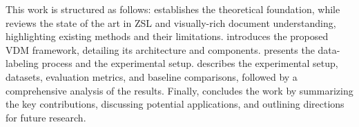 This work is structured as follows:  establishes the theoretical foundation, while  reviews the state of the art in \gls{ZSL} and visually-rich document understanding, highlighting existing methods and their limitations.  introduces the proposed \gls{VDM} framework, detailing its architecture and components.  presents the data-labeling process and the experimental setup.  describes the experimental setup, datasets, evaluation metrics, and baseline comparisons, followed by a comprehensive analysis of the results. Finally,  concludes the work by summarizing the key contributions, discussing potential applications, and outlining directions for future research.
